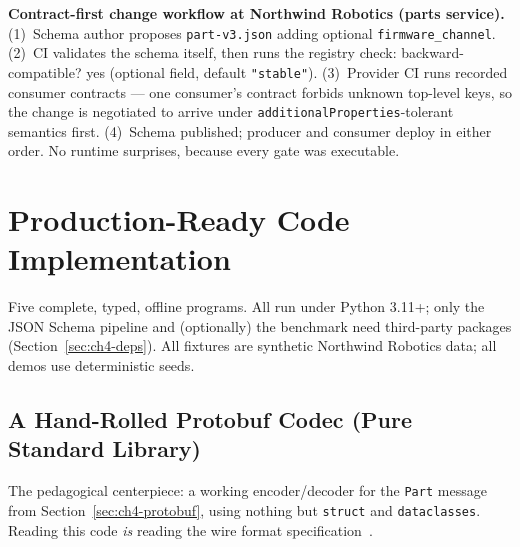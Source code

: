 \begin{examplebox}
\textbf{Contract-first change workflow at Northwind Robotics (parts service).}
(1)~Schema author proposes \texttt{part-v3.json} adding optional
\texttt{firmware\_channel}. (2)~CI validates the schema itself, then runs the
registry check: backward-compatible? yes (optional field, default
\texttt{"stable"}). (3)~Provider CI runs recorded consumer contracts --- one
consumer's contract forbids unknown top-level keys, so the change is negotiated to
arrive under \texttt{additionalProperties}-tolerant semantics first.
(4)~Schema published; producer and consumer deploy in either order. No runtime
surprises, because every gate was executable.
\end{examplebox}

\section{Production-Ready Code Implementation}
\label{sec:ch4-code}

Five complete, typed, offline programs. All run under Python 3.11+; only the JSON
Schema pipeline and (optionally) the benchmark need third-party packages
(Section~\ref{sec:ch4-deps}). All fixtures are synthetic Northwind Robotics data;
all demos use deterministic seeds.

\subsection{A Hand-Rolled Protobuf Codec (Pure Standard Library)}
\label{sec:ch4-code-proto}

The pedagogical centerpiece: a working encoder/decoder for the \texttt{Part}
message from Section~\ref{sec:ch4-protobuf}, using nothing but \texttt{struct} and
\texttt{dataclasses}. Reading this code \emph{is} reading the wire format
specification~\cite{protobufdocs}.

